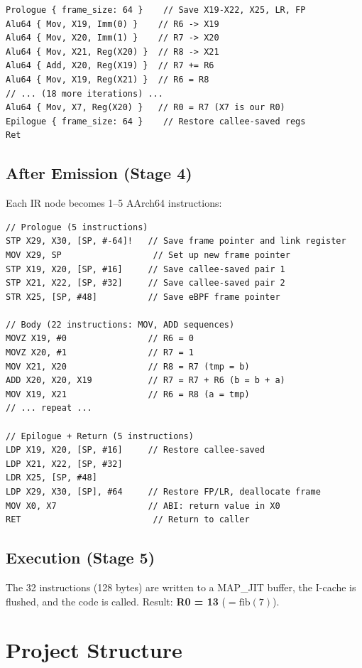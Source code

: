 \documentclass[11pt,letterpaper]{article}
\begin{document}
\begin{lstlisting}[style=rust]
Prologue { frame_size: 64 }    // Save X19-X22, X25, LR, FP
Alu64 { Mov, X19, Imm(0) }    // R6 -> X19
Alu64 { Mov, X20, Imm(1) }    // R7 -> X20
Alu64 { Mov, X21, Reg(X20) }  // R8 -> X21
Alu64 { Add, X20, Reg(X19) }  // R7 += R6
Alu64 { Mov, X19, Reg(X21) }  // R6 = R8
// ... (18 more iterations) ...
Alu64 { Mov, X7, Reg(X20) }   // R0 = R7 (X7 is our R0)
Epilogue { frame_size: 64 }    // Restore callee-saved regs
Ret
\end{lstlisting}

\subsection{After Emission (Stage 4)}

Each IR node becomes 1--5 AArch64 instructions:

\begin{lstlisting}[style=asm]
// Prologue (5 instructions)
STP X29, X30, [SP, #-64]!   // Save frame pointer and link register
MOV X29, SP                  // Set up new frame pointer
STP X19, X20, [SP, #16]     // Save callee-saved pair 1
STP X21, X22, [SP, #32]     // Save callee-saved pair 2
STR X25, [SP, #48]          // Save eBPF frame pointer

// Body (22 instructions: MOV, ADD sequences)
MOVZ X19, #0                // R6 = 0
MOVZ X20, #1                // R7 = 1
MOV X21, X20                // R8 = R7 (tmp = b)
ADD X20, X20, X19           // R7 = R7 + R6 (b = b + a)
MOV X19, X21                // R6 = R8 (a = tmp)
// ... repeat ...

// Epilogue + Return (5 instructions)
LDP X19, X20, [SP, #16]     // Restore callee-saved
LDP X21, X22, [SP, #32]
LDR X25, [SP, #48]
LDP X29, X30, [SP], #64     // Restore FP/LR, deallocate frame
MOV X0, X7                  // ABI: return value in X0
RET                          // Return to caller
\end{lstlisting}

\subsection{Execution (Stage 5)}

The 32 instructions (128 bytes) are written to a MAP\_JIT buffer, the I-cache is flushed, and the code is called. Result: \textbf{R0 = 13} ($= \text{fib}(7)$).

\section{Project Structure}
\label{sec:structure}
\end{document}
